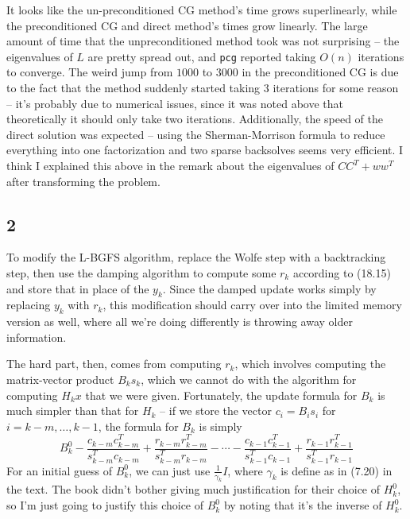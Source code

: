 \documentclass{article}
\begin{document}
It looks like the un-preconditioned CG method's time grows superlinearly, while the preconditioned CG and direct method's times grow linearly. The large amount of time that the unpreconditioned method took was not surprising -- the eigenvalues of $L$ are pretty spread out, and \verb|pcg| reported taking $O(n)$ iterations to converge. 
The weird jump from $1000$ to $3000$ in the preconditioned CG is due to the fact that the method suddenly started taking 3 iterations for some reason -- it's probably due to numerical issues, since it was noted above that theoretically it should only take two iterations. Additionally, the speed of the direct solution was expected -- using the Sherman-Morrison formula to reduce everything into one factorization and two sparse backsolves seems very efficient.
I think I explained this above in the remark about the eigenvalues of $CC^T+ww^T$ after transforming the problem.
\subsection*{2}
To modify the L-BGFS algorithm, replace the Wolfe step with a backtracking step, then use the damping algorithm to compute some $r_k$ according to (18.15) and store that in place of the $y_k$. Since the damped update works simply by replacing $y_k$ with $r_k$, this modification should carry over into the limited memory version as well, where all we're doing differently is throwing away older information.

The hard part, then, comes from computing $r_k$, which involves computing the matrix-vector product $B_ks_k$, which we cannot do with the algorithm for computing $H_kx$ that we were given. Fortunately, the update formula for $B_k$ is much simpler than that for $H_k$ -- if we store the vector $c_i=B_is_i$ for $i=k-m,\ldots,k-1$, the formula for $B_k$ is simply 
\[B_k^0-\frac{c_{k-m}c_{k-m}^T}{s_{k-m}^Tc_{k-m}}+\frac{r_{k-m}r_{k-m}^T}{s_{k-m}^Tr_{k-m}}-\cdots-\frac{c_{k-1}c_{k-1}^T}{s_{k-1}^Tc_{k-1}}+\frac{r_{k-1}r_{k-1}^T}{s_{k-1}^Tr_{k-1}}\]
For an initial guess of $B_k^0$, we can just use $\frac{1}{\gamma_k}I$, where $\gamma_k$ is define as in (7.20) in the text. The book didn't bother giving much justification for their choice of $H_k^0$, so I'm just going to justify this choice of $B_k^0$ by noting that it's the inverse of $H_k^0$.
\end{document}
